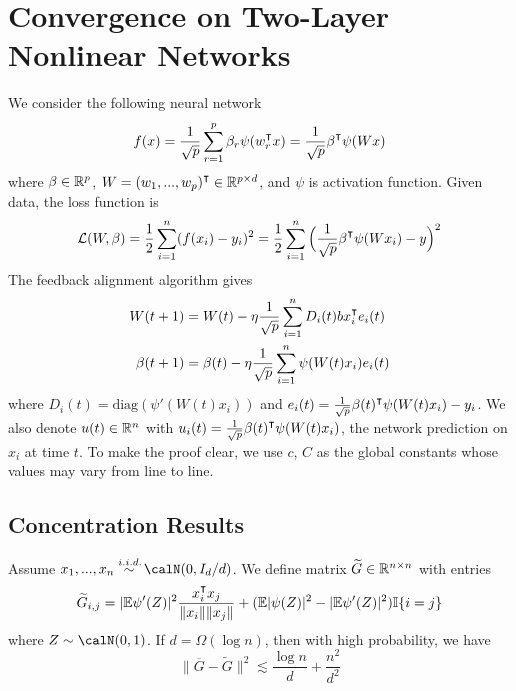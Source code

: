 
\section{Convergence on Two-Layer Nonlinear Networks}\label{sec:appendix-convergence}
We consider the following neural network
\begin{equation}
f(x) = \frac{1}{\sqrt p}\sum_{r=1}^p \beta_r \psi(w_r\transpose x) = \frac{1}{\sqrt p}\beta\transpose \psi(Wx)
\end{equation}
where $\beta \in \mathbb{R}^p$, $W = (w_1,...,w_p)\transpose\in\R^{p\times d}$, and $\psi$ is activation function. Given data, the loss function is 
\begin{equation}
\Loss(W, \beta) = \frac{1}{2}\sum_{i=1}^n(f(x_i)-y_i)^2 = \frac{1}{2}\sum_{i=1}^n\Big(\frac{1}{\sqrt p}\beta\transpose \psi(Wx_i)-y\Big)^2
\end{equation}
The feedback alignment algorithm gives
\begin{equation}
\label{eq:updates}
\begin{aligned}
    W(t+1) &= W(t) - \eta\frac{1}{\sqrt p}\sum_{i=1}^nD_i(t)bx_i\transpose e_i(t) \\
    \beta(t+1) &= \beta(t)- \eta \frac{1}{\sqrt p}\sum_{i=1}^n \psi(W(t)x_i)e_i(t)
\end{aligned}
\end{equation}
where $D_i(t) = \text{diag}(\psi'(W(t)x_i))$ and $e_i(t) = \frac{1}{\sqrt p}\beta(t)\transpose \psi(W(t)x_i)-y_i$. We also denote $u(t)\in\mathbb{R}^n$ with $u_i(t) = \frac{1}{\sqrt p}\beta(t)\transpose \psi(W(t)x_i)$, the network prediction on $x_i$ at time $t$. To make the proof clear, we use $c$, $C$ as the global constants whose values may vary from line to line.

\subsection{Concentration Results}

\begin{lemma}\label{lma:G}
Assume $x_1,...,x_n \overset{\iid}{\sim} \calN(0,I_d/d)$. We define  matrix $\widetilde{G}\in \mathbb{R}^{n\times n}$ with entries
\begin{equation*}
    \widetilde{G}_{i,j} = |\E\psi'(Z)|^2 \frac{x_i\transpose x_j}{\|x_i\|\|x_j\|} + (\E|\psi(Z)|^2-|\E\psi'(Z)|^2)\I\{i=j\}
\end{equation*}
where $Z\sim \calN(0,1)$. If $d = \Omega(\log n)$, then with high probability, we have
\begin{equation*}
\|\overline{G}-\widetilde{G}\|^2 \lesssim \frac{\log n}{d} + \frac{n^2}{d^2}
\end{equation*}
\end{lemma}


